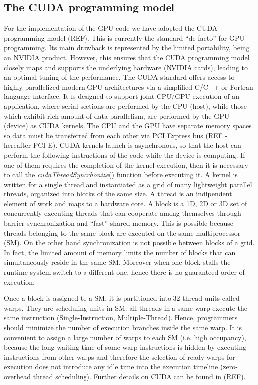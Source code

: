 \documentclass[11pt]{article}
\begin{document}
\subsection{The CUDA programming model} 

For the implementation of the GPU code we have adopted the CUDA programming model (REF). 
This is currently the standard ``de facto'' for GPU programming.
Its main drawback is represented by the limited portability, being an NVIDIA product. However,
this ensures that the CUDA programming model closely maps and supports the underlying
hardware (NVIDIA cards), leading to an optimal tuning of the performance.
The CUDA standard offers access to highly parallelized modern GPU architectures via a simplified C/C++ or Fortran language interface. It is designed to support joint CPU/GPU execution of an application, where serial sections are performed by the CPU (host), while those which exhibit rich amount of data parallelism, are performed by the GPU (device) as CUDA kernels. The CPU and the GPU have separate memory spaces so data must be transferred from each other via PCI Express bus (REF - hereafter PCI-E). 
CUDA kernels launch is asynchronous, so that the host can
 perform the following instructions of the code while the device is computing. If one of them requires the completion 
of the kernel execution, then it is necessary to call the \textit{cudaThreadSyncrhonize}() function before executing it.
A kernel is written for a single thread and instantiated as a grid of many lightweight parallel threads, organized into blocks of the same size. A thread is an indipendent element of work and maps to a hardware core. A block is a 1D, 2D or 3D set of concurrently executing threads that can cooperate among themselves through barrier synchronization and ``fast'' shared memory. 
This is possible because threads belonging to the same block are executed on the same multiprocessor (SM). On the other hand
 synchronization is not possible between blocks of a grid. In fact, the limited amount of memory limits the number of 
blocks that can simultaneously reside in the same SM. Moreover when one block stalls the runtime system switch to 
a different one, hence there is no guaranteed order of execution.

Once a block is assigned to a SM, it is partitioned into 32-thread units called warps. They are scheduling units in SM:
all threads in a same warp execute the same instruction (Single-Instruction, Multiple-Thread). Hence, programmers should minimize the number of execution branches inside the same warp. It is convenient to assign a large number of warps to each SM (i.e. high occupancy), because the long waiting time of some warp instructions is hidden by executing instructions from other warps  and therefore the selection of ready warps for execution does not introduce any idle time into the execution timeline (zero-overhead thread scheduling). Further details on CUDA can be found in (REF).
\end{document}
